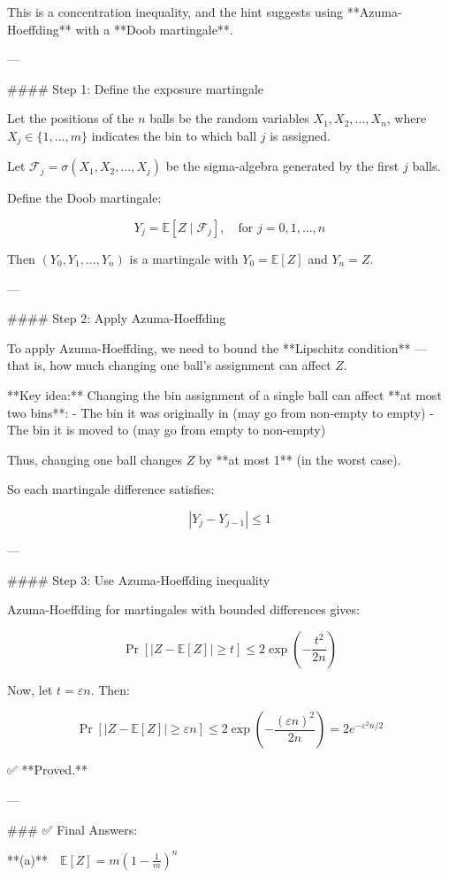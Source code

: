 \begin{enumerate}
\begin{shaded}
This is a concentration inequality, and the hint suggests using **Azuma-Hoeffding** with a **Doob martingale**.

---

#### Step 1: Define the exposure martingale

Let the positions of the \( n \) balls be the random variables \( X_1, X_2, ..., X_n \), where \( X_j \in \{1, ..., m\} \) indicates the bin to which ball \( j \) is assigned.

Let \( \mathcal{F}_j = \sigma(X_1, X_2, ..., X_j) \) be the sigma-algebra generated by the first \( j \) balls.

Define the Doob martingale:

\[
Y_j = \mathbb{E}[Z \mid \mathcal{F}_j], \quad \text{for } j = 0, 1, ..., n
\]

Then \( (Y_0, Y_1, ..., Y_n) \) is a martingale with \( Y_0 = \mathbb{E}[Z] \) and \( Y_n = Z \).

---

#### Step 2: Apply Azuma-Hoeffding

To apply Azuma-Hoeffding, we need to bound the **Lipschitz condition** — that is, how much changing one ball's assignment can affect \( Z \).

**Key idea:** Changing the bin assignment of a single ball can affect **at most two bins**:
- The bin it was originally in (may go from non-empty to empty)
- The bin it is moved to (may go from empty to non-empty)

Thus, changing one ball changes \( Z \) by **at most 1** (in the worst case).

So each martingale difference satisfies:

\[
|Y_j - Y_{j-1}| \leq 1
\]

---

#### Step 3: Use Azuma-Hoeffding inequality

Azuma-Hoeffding for martingales with bounded differences gives:

\[
\Pr[|Z - \mathbb{E}[Z]| \geq t] \leq 2\exp\left( -\frac{t^2}{2n} \right)
\]

Now, let \( t = \varepsilon n \). Then:

\[
\Pr[|Z - \mathbb{E}[Z]| \geq \varepsilon n] \leq 2\exp\left( -\frac{(\varepsilon n)^2}{2n} \right) = 2e^{-\varepsilon^2 n/2}
\]

✅ **Proved.**

---

### ✅ Final Answers:

**(a)** \(\mathbb{E}[Z] = m\left(1 - \frac{1}{m}\right)^n\)


\end{shaded}
\end{enumerate}

